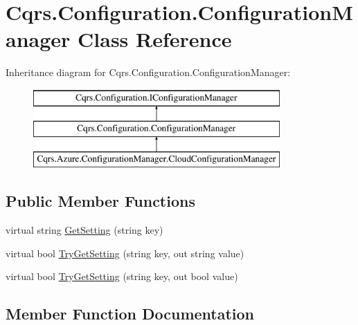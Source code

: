 \hypertarget{classCqrs_1_1Configuration_1_1ConfigurationManager}{}\section{Cqrs.\+Configuration.\+Configuration\+Manager Class Reference}
\label{classCqrs_1_1Configuration_1_1ConfigurationManager}
Inheritance diagram for Cqrs.\+Configuration.\+Configuration\+Manager\+:\begin{figure}[H]
\begin{center}
\leavevmode
\includegraphics[height=3.000000cm]{classCqrs_1_1Configuration_1_1ConfigurationManager}
\end{center}
\end{figure}
\subsection*{Public Member Functions}
\begin{DoxyCompactItemize}
\item 
virtual string \hyperlink{classCqrs_1_1Configuration_1_1ConfigurationManager_ac3e31af665b95b781fee23f577170a63_ac3e31af665b95b781fee23f577170a63}{Get\+Setting} (string key)
\item 
virtual bool \hyperlink{classCqrs_1_1Configuration_1_1ConfigurationManager_ad87af2a011af065d6d3e0d2ff01c7f6e_ad87af2a011af065d6d3e0d2ff01c7f6e}{Try\+Get\+Setting} (string key, out string value)
\item 
virtual bool \hyperlink{classCqrs_1_1Configuration_1_1ConfigurationManager_a40810d0b9fd2f3d1c4a270681e908c84_a40810d0b9fd2f3d1c4a270681e908c84}{Try\+Get\+Setting} (string key, out bool value)
\end{DoxyCompactItemize}


\subsection{Member Function Documentation}
\mbox{\label{classCqrs_1_1Configuration_1_1ConfigurationManager_ac3e31af665b95b781fee23f577170a63_ac3e31af665b95b781fee23f577170a63}} 

